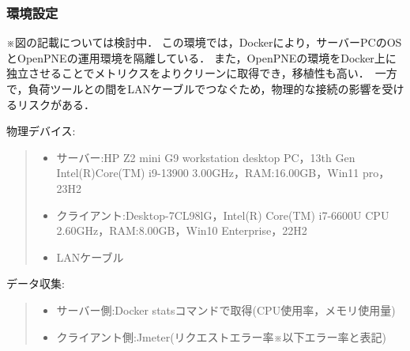 \documentclass[twoside,twocolumn,10pt]{jarticle}  %
\begin{document}
\subsubsection{環境設定}\label{subsec:env2}
※図の記載については検討中．
この環境では，Dockerにより，サーバーPCのOSとOpenPNEの運用環境を隔離している．
また，OpenPNEの環境をDocker上に独立させることでメトリクスをよりクリーンに取得でき，移植性も高い．\
一方で，負荷ツールとの間をLANケーブルでつなぐため，物理的な接続の影響を受けるリスクがある．

物理デバイス:\par
\begin{quote}
  \begin{itemize}
  \setlength{\parskip}{0cm} %
  \setlength{\itemsep}{0cm} %
  \setlength{\baselineskip}{3pt}
  \item サーバー:HP Z2 mini G9 workstation desktop PC，13th Gen Intel(R)Core(TM) i9-13900 3.00GHz，RAM:16.00GB，Win11 pro，23H2
  \item クライアント:Desktop-7CL98lG，Intel(R) Core(TM) i7-6600U CPU 2.60GHz，RAM:8.00GB，Win10 Enterprise，22H2
  \item LANケーブル
  \end{itemize}
\end{quote}
データ収集:
\begin{quote}
   \begin{itemize}
   \setlength{\parskip}{0cm} %
   \setlength{\itemsep}{0cm} %
   \item サーバー側:Docker statsコマンドで取得(CPU使用率，メモリ使用量)
   \item クライアント側:Jmeter(リクエストエラー率※以下エラー率と表記)
   \end{itemize}
\end{quote}
\end{document}
